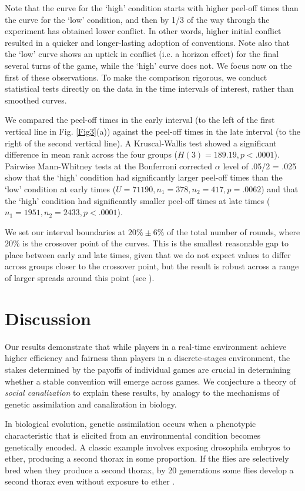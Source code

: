 \documentclass[10pt,letterpaper]{article}
\begin{document}
Note that the curve for the `high' condition starts with higher peel-off times than the curve for the `low' condition, and then by 1/3 of the way through the experiment has obtained lower conflict. In other words, higher initial conflict resulted in a quicker and longer-lasting adoption of conventions. Note also that the `low' curve shows an uptick in conflict (i.e. a horizon effect) for the final several turns of the game, while the `high' curve does not. We focus now on the first of these observations. To make the comparison rigorous, we conduct statistical tests directly on the data in the time intervals of interest, rather than smoothed curves.

We compared the peel-off times in the early interval (to the left of the first vertical line in Fig. \ref{Fig3}(a)) against the peel-off times in the late interval (to the right of the second vertical line). A Kruscal-Wallis test showed a significant difference in mean rank across the four groups ($H(3) = 189.19, p < .0001$). Pairwise Mann-Whitney tests at the Bonferroni corrected $\alpha$ level of .05/2 = .025 show that the `high' condition had significantly larger peel-off times than the `low' condition at early times ($U = 71190, n_1 =378, n_2 =417, p = .0062$) and that the `high' condition had significantly smaller peel-off times at late times ($n_1 = 1951, n_2 = 2433, p < .0001$). 

We set our interval boundaries at $20\% \pm 6\%$ of the total number of rounds, where $20\%$ is the crossover point of the curves. This is the smallest reasonable gap to place between early and late times, given that we do not expect values to differ across groups closer to the crossover point, but the result is robust across a range of larger spreads around this point (see  ). 

\section*{Discussion}

Our results demonstrate that while players in a real-time environment achieve higher efficiency and fairness than players in a discrete-stages environment, the stakes determined by the payoffs of individual games are crucial in determining whether a stable convention will emerge across games. We conjecture a theory of \emph{social canalization} to explain these results, by analogy to the mechanisms of genetic assimilation and canalization in biology. 

In biological evolution, genetic assimilation occurs when a phenotypic characteristic that is elicited from an environmental condition becomes genetically encoded.  A classic example involves exposing drosophila embryos to ether, producing a second thorax in some proportion.  If the flies are selectively bred when they produce a second thorax, by 20 generations some flies develop a second thorax even without exposure to ether \cite{Waddington56_BithoraxPhenotype}. 
\end{document}
